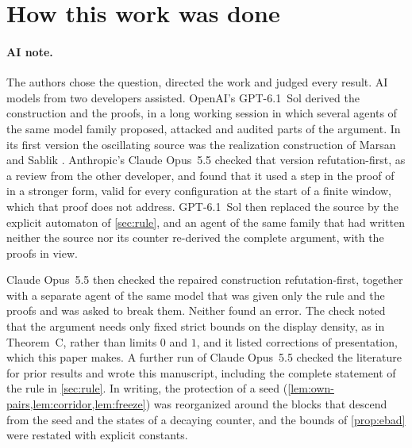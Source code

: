 \documentclass[11pt]{article}
\theoremstyle{plain}
\theoremstyle{definition}
\theoremstyle{remark}
\begin{document}
\section*{How this work was done}

\paragraph{AI note.}
The authors chose the question, directed the work and judged every result. AI models from two developers assisted. OpenAI's GPT-6.1~Sol derived the construction and the proofs, in a long working session in which several agents of the same model family proposed, attacked and audited parts of the argument. In its first version the oscillating source was the realization construction of Marsan and Sablik \cite{MS24}. Anthropic's Claude Opus~5.5 checked that version refutation-first, as a review from the other developer, and found that it used a step in the proof of \cite[Proposition~5.4]{MS24} in a stronger form, valid for every configuration at the start of a finite window, which that proof does not address. GPT-6.1~Sol then replaced the source by the explicit automaton of \cref{sec:rule}, and an agent of the same family that had written neither the source nor its counter re-derived the complete argument, with the proofs in view.

Claude Opus~5.5 then checked the repaired construction refutation-first, together with a separate agent of the same model that was given only the rule and the proofs and was asked to break them. Neither found an error. The check noted that the argument needs only fixed strict bounds on the display density, as in Theorem~C, rather than limits $0$ and $1$, and it listed corrections of presentation, which this paper makes. A further run of Claude Opus~5.5 checked the literature for prior results and wrote this manuscript, including the complete statement of the rule in \cref{sec:rule}. In writing, the protection of a seed (\cref{lem:own-pairs,lem:corridor,lem:freeze}) was reorganized around the blocks that descend from the seed and the states of a decaying counter, and the bounds of \cref{prop:ebad} were restated with explicit constants.
\end{document}
